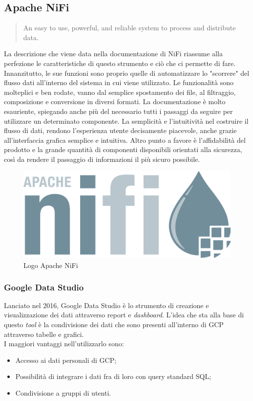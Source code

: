 \subsection{Apache NiFi}
\begin{quotation}
An easy to use, powerful, and reliable system to process and distribute data.
\end{quotation}
La descrizione che viene data nella documentazione di NiFi  riassume alla perfezione le caratteristiche di questo strumento e ciò che ci permette di fare.
\\
Innanzitutto, le sue funzioni sono proprio quelle di automatizzare lo "scorrere" del flusso dati all'interno del sistema in cui viene utilizzato. Le funzionalità sono molteplici e ben rodate, vanno dal semplice spostamento dei file, al filtraggio, composizione e conversione in diversi formati. La documentazione è molto esauriente, spiegando anche più del necessario tutti i passaggi da seguire per utilizzare un determinato componente. La semplicità e l'intuitività nel costruire il flusso di dati, rendono l'esperienza utente decisamente piacevole, anche grazie all'interfaccia grafica semplice e intuitiva. Altro punto a favore è l'affidabilità del prodotto e la grande quantità di componenti disponibili orientati alla sicurezza, così da rendere il passaggio di informazioni il più sicuro possibile.
\begin{figure}[h!]
	\centering
	\includegraphics[scale=0.1]{figures/apache-nifi-logo}
	\caption[Logo Apache NiFi.]{Logo Apache NiFi
		\label{fig:LogoApacheNiFi}}
\end{figure}
\subsubsection{Google Data Studio}
Lanciato nel 2016, Google Data Studio è lo strumento di creazione e visualizzazione dei dati attraverso report e \emph{dashboard}. L'idea che sta alla base di questo \emph{tool} è la condivisione dei dati che sono presenti all'interno di GCP attraverso tabelle e grafici.
\\ I maggiori vantaggi nell'utilizzarlo sono:
\begin{itemize}
	\item Accesso ai dati personali di GCP;
	\item Possibilità di integrare i dati fra di loro con query standard SQL;
	\item Condivisione a gruppi di utenti. 
\end{itemize}

